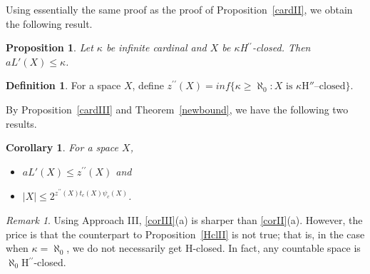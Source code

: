 \documentclass[11pt]{amsart}
\newif\ifdraft\draftfalse
\newtheorem{corollary}[theorem]{Corollary}
\newtheorem{proposition}[theorem]{Proposition}
\theoremstyle{definition}
\newtheorem{definition}[theorem]{Definition}
\theoremstyle{remark}
\newtheorem*{remark}{Remark}
\numberwithin{equation}{section}
\begin{document}
Using essentially the same proof as the proof of Proposition~\ref{cardII}, we obtain the following result.
  
\begin{proposition}{{\immediate{}}{\ifdraft\hspace{-\lastskip}\vadjust{\vspace{-1mm}\smash{\llap{{\tt {{cardIII}}}\hspace{8mm}}}\vspace{1mm}}\fi}} 
Let $\kappa$ be infinite cardinal and $X$ be  $\kappa$H$^{\prime\prime}$-closed.  Then $aL'(X) \leq \kappa$.
\end{proposition}

\begin{definition}   
For a space $X$, define $z^{\prime\prime}(X) = inf\{\kappa \geq \aleph_0: X \text{ is } \kappa\text{H}''\text{--closed}\}$.
\end{definition}

By Proposition~\ref{cardIII} and Theorem~\ref{newbound}, we have the following two results.

\begin{corollary}{{\immediate{}}{\ifdraft\hspace{-\lastskip}\vadjust{\vspace{-1mm}\smash{\llap{{\tt {{corIII}}}\hspace{8mm}}}\vspace{1mm}}\fi}} 
For a space $X$, 
\begin{itemize}
\item[(a)] $aL'(X) \leq z^{\prime\prime}(X)$ and 
\item[(b)] $|X| \leq 2^{z^{\prime\prime}(X)t_c(X)\psi_c(X)}$.
\end{itemize}
\end{corollary}

\begin{remark}
Using Approach III, \ref{corIII}(a) is sharper than \ref{corII}(a).  However, the price is that the counterpart to Proposition~\ref{HclII} is not true; that is, in the case when $\kappa = \aleph_0$, we do not necessarily get H-closed. In fact, any countable space is  $\aleph_0$H$^{\prime\prime}$-closed.
\end{remark}
\end{document}
